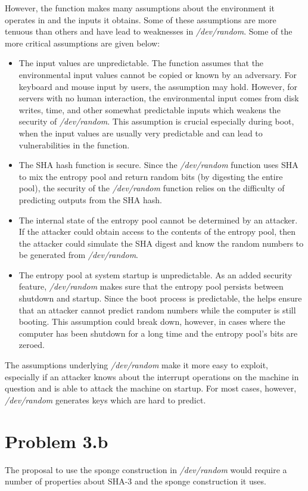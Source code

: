 \documentclass[psamsfonts]{amsart}
\begin{document}
However, the function makes many assumptions about the environment it operates in and the inputs it obtains. Some of these assumptions are more tenuous than others and have lead to weaknesses in \emph{/dev/random}. Some of the more critical assumptions are given below:
\begin{itemize}
  \item The input values are unpredictable. The function assumes that the environmental input values cannot be copied or known by an adversary. For keyboard and mouse input by users, the assumption may hold. However, for servers with no human interaction, the environmental input comes from disk writes, time, and other somewhat predictable inputs which weakens the security of \emph{/dev/random}. This assumption is crucial especially during boot, when the input values are usually very predictable and can lead to vulnerabilities in the function.
  \item The SHA hash function is secure. Since the \emph{/dev/random} function uses SHA to mix the entropy pool and return random bits (by digesting the entire pool), the security of the \emph{/dev/random} function relies on the difficulty of predicting outputs from the SHA hash.
  \item The internal state of the entropy pool cannot be determined by an attacker. If the attacker could obtain access to the contents of the entropy pool, then the attacker could simulate the SHA digest and know the random numbers to be generated from \emph{/dev/random}.
  \item The entropy pool at system startup is unpredictable. As an added security feature, \emph{/dev/random} makes sure that the entropy pool persists between shutdown and startup. Since the boot process is predictable, the helps ensure that an attacker cannot predict random numbers while the computer is still booting. This assumption could break down, however, in cases where the computer has been shutdown for a long time and the entropy pool's bits are zeroed.
\end{itemize}

The assumptions underlying \emph{/dev/random} make it more easy to exploit, especially if an attacker knows about the interrupt operations on the machine in question and is able to attack the machine on startup. For most cases, however, \emph{/dev/random} generates keys which are hard to predict.

\section{Problem 3.b}

The proposal to use the sponge construction in \emph{/dev/random} would require a number of properties about SHA-3 and the sponge construction it uses. 
\end{document}
